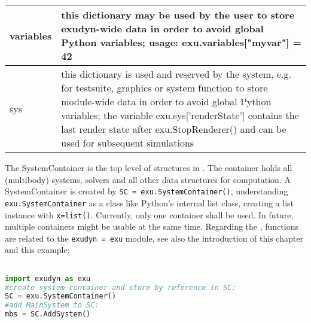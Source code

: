 \begin{center}
\begin{longtable}{| p{8cm} | p{8cm} |}
  variables & this dictionary may be used by the user to store exudyn-wide data in order to avoid global Python variables; usage: exu.variables["myvar"] = 42 \\ \hline  
  sys & this dictionary is used and reserved by the system, e.g. for testsuite, graphics or system function to store module-wide data in order to avoid global Python variables; the variable exu.sys['renderState'] contains the last render state after exu.StopRenderer() and can be used for subsequent simulations \\ \hline  
\end{longtable}
\end{center}




The SystemContainer is the top level of structures in \codeName. The container holds all (multibody) systems, solvers and all other data structures for computation. A SystemContainer is created by \texttt{SC = exu.SystemContainer()}, understanding \texttt{exu.SystemContainer} as a class like Python's internal list class, creating a list instance with \texttt{x=list()}. Currently, only one container shall be used. In future, multiple containers might be usable at the same time. Regarding the , functions are related to the \texttt{exudyn = exu} module, see also the introduction of this chapter and this example:
\pythonstyle
\begin{lstlisting}[language=Python, firstnumber=1]

import exudyn as exu
#create system container and store by reference in SC:
SC = exu.SystemContainer() 
#add MainSystem to SC:
mbs = SC.AddSystem()
\end{lstlisting}

